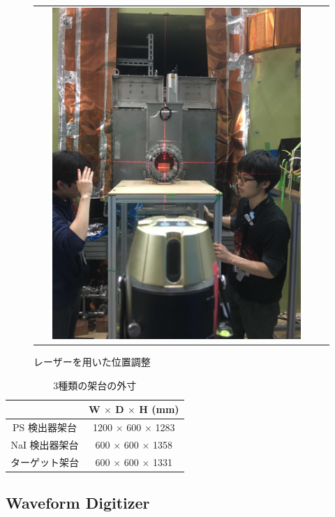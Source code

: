 \begin{figure}[H]
\begin{tabular}{cc}
\begin{minipage}{0.5\hsize}
\includegraphics[width=0.9\textwidth]{figure/hayakawa/laser1.jpg}
\caption{レーザーを用いた位置調整}
\end{minipage}
\end{tabular}
 \end{figure}
  
\begin{table}[H]
\caption{3種類の架台の外寸}
\label{tab:kadai}
\centering
\begin{tabular}{|c|c|}\hline
{} &  W $\times$ D $\times$ H (mm)\\ \hline
PS 検出器架台 &  1200 $\times$ 600 $\times$ 1283\\ \hline
NaI 検出器架台 & 600 $\times$ 600 $\times$ 1358 \\ \hline
ターゲット架台 & 600 $\times$ 600 $\times$ 1331 \\ \hline
\end{tabular}
\end{table}

\subsection{Waveform Digitizer}

